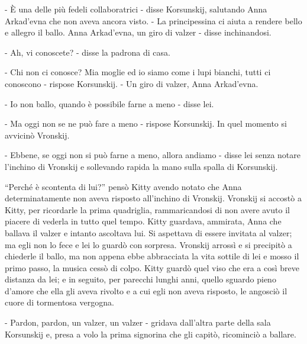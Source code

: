 - È una delle più fedeli collaboratrici - disse Korsunskij, salutando Anna Arkad'evna che non aveva ancora visto. - La principessina ci aiuta a rendere bello e allegro il ballo. Anna Arkad'evna, un giro di valzer - disse inchinandosi. 

- Ah, vi conoscete? - disse la padrona di casa. 

- Chi non ci conosce? Mia moglie ed io siamo come i lupi bianchi, tutti ci conoscono - rispose Korsunskij. - Un giro di valzer, Anna Arkad'evna. 

- Io non ballo, quando è possibile farne a meno - disse lei. 

- Ma oggi non se ne può fare a meno - rispose Korsunskij. In quel momento si avvicinò Vronskij. 

- Ebbene, se oggi non si può farne a meno, allora andiamo - disse lei senza notare l'inchino di Vronskij e sollevando rapida la mano sulla spalla di Korsunskij. 

``Perché è scontenta di lui?'' pensò Kitty avendo notato che Anna determinatamente non aveva risposto all'inchino di Vronskij. Vronskij si accostò a Kitty, per ricordarle la prima quadriglia, rammaricandosi di non avere avuto il piacere di vederla in tutto quel tempo. Kitty guardava, ammirata, Anna che ballava il valzer e intanto ascoltava lui. Si aspettava di essere invitata al valzer; ma egli non lo fece e lei lo guardò con sorpresa. Vronskij arrossì e si precipitò a chiederle il ballo, ma non appena ebbe abbracciata la vita sottile di lei e mosso il primo passo, la musica cessò di colpo. Kitty guardò quel viso che era a così breve distanza da lei; e in seguito, per parecchi lunghi anni, quello sguardo pieno d'amore che ella gli aveva rivolto e a cui egli non aveva risposto, le angosciò il cuore di tormentosa vergogna. 

- Pardon, pardon, un valzer, un valzer - gridava dall'altra parte della sala Korsunskij e, presa a volo la prima signorina che gli capitò, ricominciò a ballare. 

\label{xxiii} 

